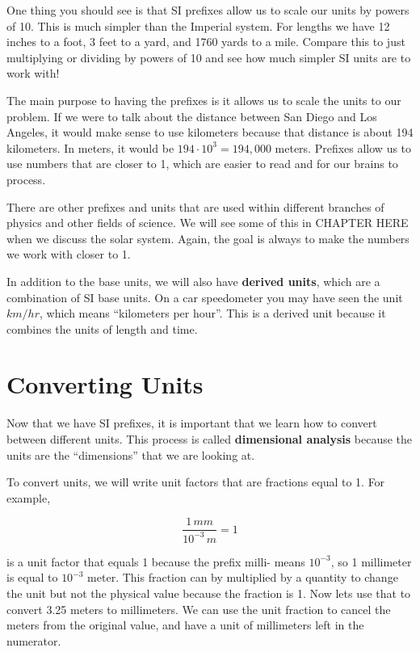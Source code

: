 \documentclass[12pt]{book}
\begin{document}
One thing you should see is that SI prefixes allow us to scale our units by powers of 10. This is much simpler than the Imperial system. For lengths we have 12 inches to a foot, 3 feet to a yard, and 1760 yards to a mile. Compare this to just multiplying or dividing by powers of 10 and see how much simpler SI units are to work with!

The main purpose to having the prefixes is it allows us to scale the units to our problem. If we were to talk about the distance between San Diego and Los Angeles, it would make sense to use kilometers because that distance is about 194 kilometers. In meters, it would be $194 \cdot 10^3 = 194,000$ meters. Prefixes allow us to use numbers that are closer to 1, which are easier to read and for our brains to process. 

There are other prefixes and units that are used within different branches of physics and other fields of science. We will see some of this in CHAPTER HERE when we discuss the solar system. Again, the goal is always to make the numbers we work with closer to 1.

In addition to the base units, we will also have \textbf{derived units}, which are a combination of SI base units. On a car speedometer you may have seen the unit $km/hr$, which means ``kilometers per hour''. This is a derived unit because it combines the units of length and time.


\section{Converting Units}

Now that we have SI prefixes, it is important that we learn how to convert between different units. This process is called \textbf{dimensional analysis} because the units are the ``dimensions'' that we are looking at.

To convert units, we will write unit factors that are fractions equal to 1. For example, 

\begin{equation}
\frac{1 \, mm}{10^{-3} \, m} = 1
\end{equation}

is a unit factor that equals 1 because the prefix milli- means $10^{-3}$, so 1 millimeter is equal to $10^{-3}$ meter. This fraction can by multiplied by a quantity to change the unit but not the physical value because the fraction is 1. Now lets use that to convert 3.25 meters to millimeters. We can use the unit fraction to cancel the meters from the original value, and have a unit of millimeters left in the numerator.
\end{document}
